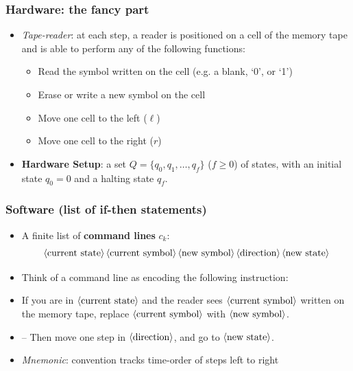 \begin{frame}
\frametitle{Hardware: the fancy part}

\begin{itemize}[<+->]

\item \emph{Tape-reader}: at each step, a reader is positioned on a cell of the memory tape and is able to perform any of the following functions: 

      \begin{itemize}
      \item Read the symbol written on the cell (e.g. a blank, `0', or `1')
      \item Erase or write a new symbol on the cell 
      \item Move one cell to the left ($\ell$)
      \item Move one cell to the right ($r$)
      \end{itemize}

\item \textbf{Hardware Setup}: a set $Q = \{ q_0, q_1, \dots, q_f \}$ ($f \geq 0$) of states, with an initial state $q_0 = 0$ and a halting state $q_f$. 

\end{itemize}

\end{frame}

\begin{frame}
\frametitle{Software (list of if-then statements)}

\begin{itemize}[<+->]

\item A finite list of \textbf{command lines} $c_k$:
\[
\left\langle {\text{current state}} \right\rangle \left\langle {\text{current symbol}} \right\rangle \left\langle {\text{new symbol}} \right\rangle \left\langle {\text{direction}} \right\rangle \left\langle {\text{new state}} \right\rangle
\]
\item Think of a command line as encoding the following instruction:

\item[] If you are in $\left\langle {\text{current state}} \right\rangle$ and the reader sees $\left\langle {\text{current symbol}} \right\rangle$ written on the memory tape, replace $\left\langle {\text{current symbol}} \right\rangle$ with $\left\langle {\text{new symbol}} \right\rangle$. 
\item[] -- Then move one step in $\left\langle {\text{direction}} \right\rangle$, and go to $\left\langle {\text{new state}} \right\rangle$.

\item \textit{Mnemonic}: convention tracks time-order of steps left to right

\end{itemize}
\end{frame}

